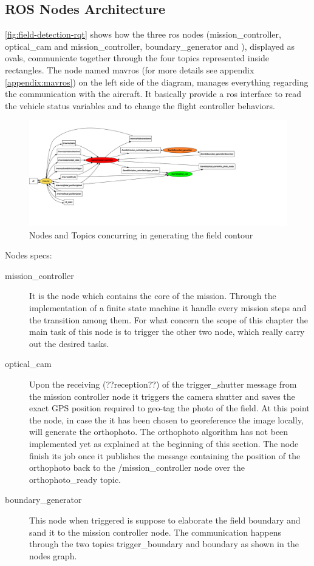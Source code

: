 \subsection{ROS Nodes Architecture} %
\label{sub:ros_nodes}
\autoref{fig:field-detection-rqt} shows how the three \acrshort{ros} nodes (\textsf{mission\_controller}, \textsf{optical\_cam} and \textsf{mission\_controller}, \textsf{boundary\_generator} and ), displayed as ovals, communicate together through the four topics represented inside rectangles. The node named \textsf{mavros} (for more details see appendix \ref{appendix:mavros}) on the left side of the diagram, manages everything regarding the communication with the aircraft. It basically provide a \acrshort{ros} interface to read the vehicle status variables and to change the flight controller behaviors.\par
\begin{figure}[ht]
    \centering
    \includegraphics[width=1.3\textwidth]{figures/C2/fieldDetection-rqt_graph.pdf}
    \caption{Nodes and Topics concurring in generating the field contour}
    \label{fig:field-detection-rqt}
\end{figure}
Nodes specs:
\begin{description}
	\item[\textsf{mission\_controller}] It is the node which contains the core of the mission. Through the implementation of a finite state machine it handle every mission steps and the transition among them. For what concern the scope of this chapter the main task of this node is to trigger the other two node, which really carry out the desired tasks.
	\item[\textsf{optical\_cam}] Upon the receiving (??reception??) of the \textsf{trigger\_shutter} message from the mission controller node it triggers the camera shutter and saves the exact GPS position required to geo-tag the photo of the field.
	At this point the node, in case the it has been chosen to georeference the image locally, will generate the orthophoto. The orthophoto algorithm has not been implemented yet as explained at the beginning of this section.
	The node finish its job once it publishes the message containing the position of the orthophoto back to the \textsf{/mission\_controller} node over the \textsf{orthophoto\_ready} topic. 
	\item[\textsf{boundary\_generator}] This node when triggered is suppose to elaborate the field boundary and sand it to the mission controller node. The communication happens through the two topics \textsf{trigger\_boundary} and \textsf{boundary} as shown in the nodes graph.
\end{description}
